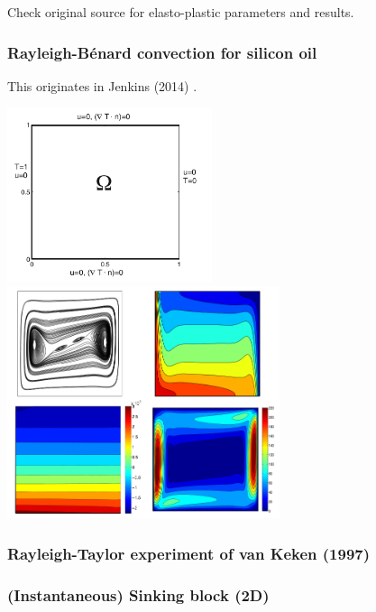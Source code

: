 Check original source for elasto-plastic parameters and results. 


\subsubsection{Rayleigh-B{\'e}nard convection for silicon oil}

This originates in Jenkins \etal (2014) \cite{jejl14}.

\begin{center}
\includegraphics[width=6cm]{images/benchmark_jejl14/jejl14a}
\includegraphics[width=8cm]{images/benchmark_jejl14/jejl14b}
\end{center}



\newpage
\subsubsection{Rayleigh-Taylor experiment of van Keken \etal (1997)} \label{ss:vaks97}


\newpage
\subsubsection{(Instantaneous) Sinking block (2D)} \label{ss:sinking_block}


